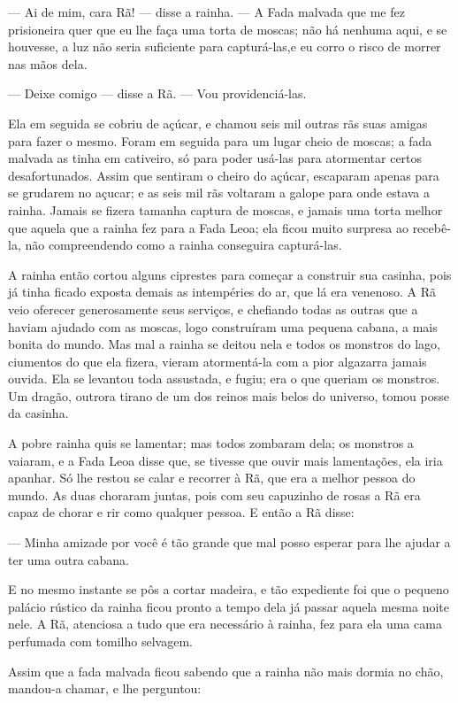 — Ai de mim, cara Rã! — disse a rainha. — A Fada malvada que me fez
prisioneira quer que eu lhe faça uma torta de moscas; não há nenhuma
aqui, e se houvesse, a luz não seria suficiente para capturá-las,e eu
corro o risco de morrer nas mãos dela. 

— Deixe comigo — disse a Rã. — Vou providenciá-las.

Ela em seguida se cobriu de açúcar, e chamou seis mil outras rãs suas
amigas para fazer o mesmo. Foram em seguida para um lugar cheio de
moscas; a fada malvada as tinha em cativeiro, só para poder usá-las
para atormentar certos desafortunados. Assim que sentiram o cheiro do
açúcar, escaparam apenas para se grudarem no açucar; e as seis mil
rãs voltaram a galope para onde estava a rainha. Jamais se fizera
tamanha captura de moscas, e jamais uma torta melhor que aquela que a
rainha fez para a Fada Leoa; ela ficou muito surpresa ao recebê-la,
não compreendendo como a rainha conseguira capturá-las.

A rainha então cortou alguns ciprestes para começar a construir sua
casinha, pois já tinha ficado exposta demais as intempéries do ar,
que lá era venenoso. A Rã veio oferecer generosamente seus serviços,
e chefiando todas as outras que a haviam ajudado com as moscas, logo
construíram uma pequena cabana, a mais bonita do mundo. Mas mal a
rainha se deitou nela e todos os monstros do lago, ciumentos do que
ela fizera, vieram atormentá-la com a pior algazarra jamais ouvida.
Ela se levantou toda assustada, e fugiu; era o que queriam os
monstros. Um dragão, outrora tirano de um dos reinos mais belos do
universo, tomou posse da casinha.

A pobre rainha quis se lamentar; mas todos zombaram dela; os monstros
a vaiaram, e a Fada Leoa disse que, se tivesse que ouvir mais
lamentações, ela iria apanhar. Só lhe restou se calar e recorrer à
Rã, que era a melhor pessoa do mundo. As duas choraram juntas, pois
com seu capuzinho de rosas a Rã era capaz de chorar e rir como
qualquer pessoa. E então a Rã disse:

— Minha amizade por você é tão grande que mal posso esperar para lhe
ajudar a ter uma outra cabana.

E no mesmo instante se pôs a cortar madeira, e tão expediente foi que
o pequeno palácio rústico da rainha ficou pronto a tempo dela já
passar aquela mesma noite nele. A Rã, atenciosa a tudo que era
necessário à rainha, fez para ela uma cama perfumada com tomilho
selvagem. 

Assim que a fada malvada ficou sabendo que a rainha não mais dormia no
chão, mandou-a chamar, e lhe perguntou:

